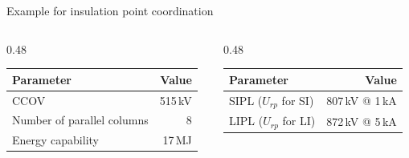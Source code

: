 \begin{frame}{Example for insulation point coordination}
  \begin{columns}[T,onlytextwidth]
    \begin{column}{0.48\textwidth}
      \renewcommand{\arraystretch}{1.3}
      \begin{tabular}{@{}p{4.2cm}r@{}}
        \textbf{Parameter} & \textbf{Value} \\
        \hline
        CCOV                        & 515\,kV \\
        Number of parallel columns  & 8 \\
        Energy capability           & 17\,MJ \\
      \end{tabular}
    \end{column}
    \begin{column}{0.48\textwidth}
      \renewcommand{\arraystretch}{1.3}
      \begin{tabular}{@{}p{4.4cm}r@{}}
        \textbf{Parameter} & \textbf{Value} \\
        \hline
        SIPL ($U_{rp}$ for SI) & 807\,kV @ 1\,kA \\
        LIPL ($U_{rp}$ for LI) & 872\,kV @ 5\,kA \\
      \end{tabular}
    \end{column}
  \end{columns}
\end{frame}

